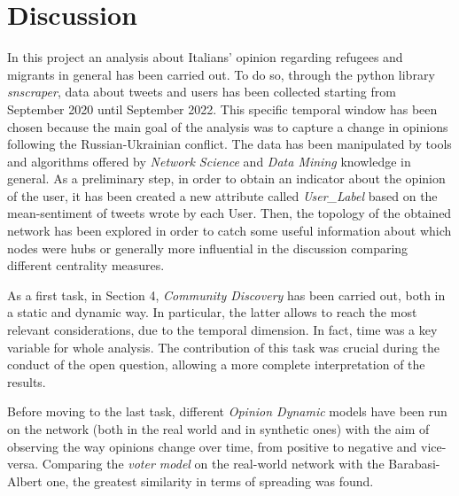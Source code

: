 \documentclass[sigchi]{acmart}
\begin{document}
\section{Discussion}
In this project an analysis about Italians' opinion regarding refugees and migrants in general has been carried out. To do so, through the python library \textit{snscraper}, data about tweets and users has been collected starting from September 2020 until September 2022. This specific temporal window has been chosen because the main goal of the analysis was to capture a change in opinions following the Russian-Ukrainian conflict. The data has been  manipulated by tools and algorithms offered by \textit{Network Science} and \textit{Data Mining} knowledge in general. As a preliminary step, in order to obtain an indicator about the opinion of the user, it has been created a new attribute called \textit{User\_Label} based on the mean-sentiment of tweets wrote by each User. Then, the topology of the obtained network has been explored in order to catch some useful information about which nodes were hubs or generally more influential in the discussion comparing different centrality measures. 

As a first task, in Section 4, \textit{Community Discovery} has been carried out, both in a static and dynamic way. In particular, the latter allows to reach the most relevant considerations, due to the temporal dimension. In fact, time was a key variable for whole analysis. The contribution of this task was crucial during the conduct of the open question, allowing a more complete interpretation of the results.

Before moving to the last task, different \textit{Opinion Dynamic} models have been run on the network (both in the real world and in synthetic ones) with the aim of observing the way opinions change over time, from positive to negative and vice-versa. Comparing the \textit{voter model} on the real-world network with the Barabasi-Albert one, the greatest similarity in terms of spreading was found.
\end{document}
